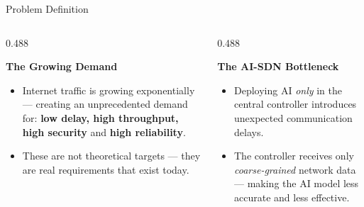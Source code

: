 {
\begin{frame}{Problem Definition}


  \begin{columns}[T, totalwidth=\textwidth]

    \begin{column}{0.488\textwidth}
      \begin{tcolorbox}[problemcard=HUAblue]
        {\color{HUAblue}\bfseries\small
          The Growing Demand}
        \vspace{4pt}
        \begin{itemize}
          \setlength\itemsep{3pt}
          \footnotesize
          \item Internet traffic is growing exponentially ---
                creating an unprecedented demand for:
                \textbf{low delay, high throughput,
                high security} and \textbf{high reliability}.
          \item These are not theoretical targets ---
                they are real requirements that
                exist today.
        \end{itemize}
      \end{tcolorbox}
    \end{column}

    \begin{column}{0.488\textwidth}
      \begin{tcolorbox}[problemcard=problemorange]
        {\color{problemorange}\bfseries\small
          The AI-SDN Bottleneck}
        \vspace{4pt}
        \begin{itemize}
          \setlength\itemsep{3pt}
          \footnotesize
          \item Deploying AI \textit{only} in the central
                controller introduces unexpected
                communication delays.
          \item The controller receives only
                \textit{coarse-grained} network data ---
                making the AI model less accurate
                and less effective.\newline
        \end{itemize}
      \end{tcolorbox}
    \end{column}


\end{columns}
\end{frame}}

